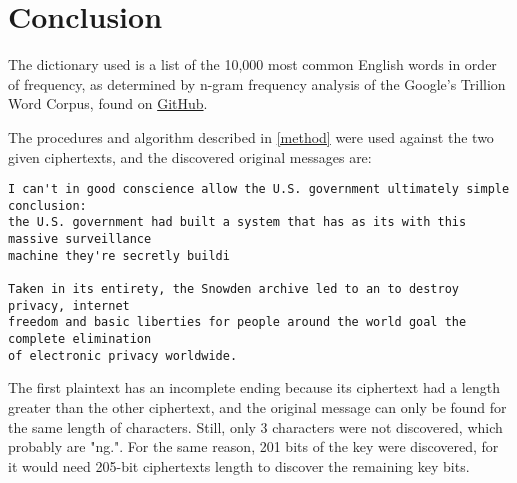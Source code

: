 \documentclass[a4paper,11pt]{article}
\begin{document}
\section{Conclusion}
\hspace{14pt}

The dictionary used is a list of the 10,000 most common English words in order of
frequency, as determined by n-gram frequency analysis of the Google's Trillion
Word Corpus, found on \href{https://github.com/first20hours/google-10000-english}{GitHub}.

The procedures and algorithm described in \ref{method} were used against the two
given ciphertexts, and the discovered original messages are:

\begin{verbatim}
I can't in good conscience allow the U.S. government ultimately simple conclusion:
the U.S. government had built a system that has as its with this massive surveillance
machine they're secretly buildi

Taken in its entirety, the Snowden archive led to an to destroy privacy, internet
freedom and basic liberties for people around the world goal the complete elimination
of electronic privacy worldwide.
\end{verbatim}

The first plaintext has an incomplete ending because its ciphertext had a length
greater than the other ciphertext, and the original message can only be found for
the same length of characters. Still, only 3 characters were not discovered, which
probably are "ng.". For the same reason, 201 bits of the key were discovered, for
it would need 205-bit ciphertexts length to discover the remaining key bits.

\end{document}
